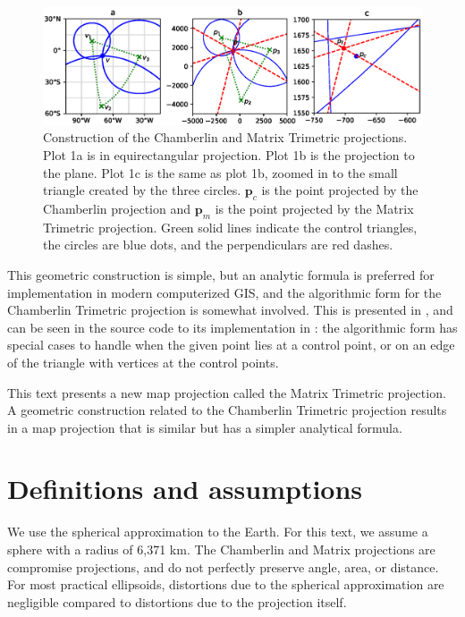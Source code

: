 \documentclass[]{interact}
\begin{document}
\begin{figure}%
  \includegraphics[width=\textwidth]{construction}
  \caption{Construction of the Chamberlin and Matrix Trimetric projections.
  Plot 1a is in equirectangular projection. Plot 1b is the projection
  to the plane. Plot 1c is the same as plot 1b, zoomed in to the small
  triangle created by the three circles. $\mathbf p_c$ is the point projected
  by the Chamberlin projection and $\mathbf p_m$ is the point projected
  by the Matrix Trimetric projection. Green solid lines indicate the control
  triangles, the circles are blue dots, and the perpendiculars are red dashes.}
  \label{fig:chamberlin}
\end{figure}

This geometric construction is simple, but an analytic formula is preferred for
implementation in modern computerized GIS, and the algorithmic form for the
Chamberlin Trimetric projection is somewhat involved. This is presented in
\citet{christensen}, and can be seen in the source code to its implementation in
\citet{proj}: the algorithmic form has special cases to handle when the given
point lies at a control point, or on an edge of the triangle with vertices at
the control points. %

This text presents a new map projection called the Matrix Trimetric projection.
A geometric construction related to the Chamberlin Trimetric projection results
in a map projection that is similar but has a simpler analytical formula.

\section{Definitions and assumptions}
We use the spherical approximation to the Earth. For this text, we assume a
sphere with a radius of 6,371 km. The Chamberlin and Matrix projections are
compromise projections, and do not perfectly preserve angle, area, or distance.
For most practical ellipsoids, distortions due to the spherical approximation
are negligible compared to distortions due to the projection itself.
\end{document}
